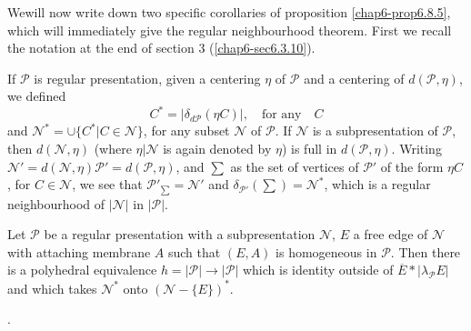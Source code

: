 We\pageoriginale will now write down two specific corollaries of proposition 
\ref{chap6-prop6.8.5}, which will immediately give the regular neighbourhood theorem. First we recall the notation at the end of section 3 
(\ref{chap6-sec6.3.10}).

If $\mathscr{P}$ is regular presentation, given a centering $\eta$ of $\mathscr{P}$ and a centering of $d(\mathscr{P},\eta)$, we defined 
$$
C^{*}=|\delta_{d\mathscr{P}}(\eta C)|,\quad\text{for any}\quad C
$$
and $\mathscr{N}^{*}=\cup\{C^{*}|C\in\mathscr{N}\}$, for any subset $\mathscr{N}$ of $\mathscr{P}$. If $\mathscr{N}$ is a subpresentation of $\mathscr{P}$, then $d(\mathscr{N},\eta)$ (where $\eta|\mathscr{N}$ is again denoted by $\eta$) is full in $d(\mathscr{P},\eta)$. Writing $\mathscr{N}'=d(\mathscr{N},\eta)\mathscr{P}'=d(\mathscr{P},\eta)$, and $\sum$ as the set of vertices of $\mathscr{P}'$ of the form $\eta C$, for $C\in \mathscr{N}$, we see that $\mathscr{P}'_{\sum}=\mathscr{N}'$ and $\delta_{\mathscr{P}'}(\sum)=\mathscr{N}^{\ast}$, which is a regular neighbourhood of $|\mathscr{N}|$ in $|\mathscr{P}|$.

\begin{corollary}\label{chap6-coro6.8.6}
Let $\mathscr{P}$ be a regular presentation with a subpresentation $\mathscr{N}$, $E$ a free edge of $\mathscr{N}$ with attaching membrane $A$ such that $(E,A)$ is homogeneous in $\mathscr{P}$. Then there is a polyhedral equivalence $h=|\mathscr{P}|\to |\mathscr{P}|$ which is identity outside of $\overline{E}\ast |\lambda_{\mathscr{P}}E|$ and which takes $\mathscr{N}^{*}$ onto $(\mathscr{N}-\{E\})^{\ast}$. 

\medskip
{}.
\end{corollary}

